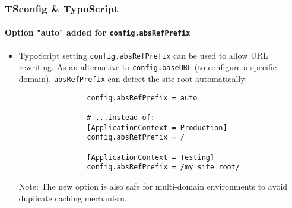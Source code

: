 \begin{frame}[fragile]
	\frametitle{TSconfig \& TypoScript}
	\framesubtitle{Option "auto" added for \texttt{config.absRefPrefix}}

	\begin{itemize}
		\item TypoScript setting \texttt{config.absRefPrefix} can be used to allow URL
			rewriting. As an alternative to \texttt{config.baseURL} (to configure a specific
			domain), \texttt{absRefPrefix} can detect the site root automatically:

			\begin{lstlisting}
				config.absRefPrefix = auto

				# ...instead of:
				[ApplicationContext = Production]
				config.absRefPrefix = /

				[ApplicationContext = Testing]
				config.absRefPrefix = /my_site_root/
			\end{lstlisting}

		\smaller
			Note: The new option is also safe for multi-domain environments to avoid
			duplicate caching mechanism.
		\normalsize

	\end{itemize}

\end{frame}


